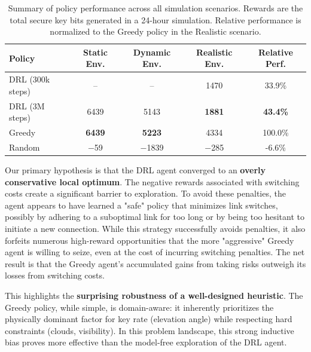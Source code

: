\documentclass[manuscript, review, nonacm]{acmart}
\begin{document}
\begin{table}[t]
  \centering
  \caption{Summary of policy performance across all simulation scenarios. Rewards are the total secure key bits generated in a 24-hour simulation. Relative performance is normalized to the Greedy policy in the Realistic scenario.}
  \label{tab:results}
  \begin{tabular}{lcccc}
    \toprule
    \textbf{Policy} & \textbf{Static Env.} & \textbf{Dynamic Env.} & \textbf{Realistic Env.} & \textbf{Relative Perf.} \\
    \midrule
    DRL (300k steps) & -- & -- & \num[group-separator={,}]{1470} & 33.9\% \\ %
    DRL (3M steps) & \num[group-separator={,}]{6439} & \num[group-separator={,}]{5143} & \textbf{\num[group-separator={,}]{1881}} & \textbf{43.4\%} \\
    Greedy & \textbf{\num[group-separator={,}]{6439}} & \textbf{\num[group-separator={,}]{5223}} & \num[group-separator={,}]{4334} & 100.0\% \\
    Random & \num[group-separator={,}]{-59} & \num[group-separator={,}]{-1839} & \num[group-separator={,}]{-285} & -6.6\% \\
    \bottomrule
  \end{tabular}
\end{table}


Our primary hypothesis is that the DRL agent converged to an \textbf{overly conservative local optimum}. The negative rewards associated with switching costs create a significant barrier to exploration. To avoid these penalties, the agent appears to have learned a "safe" policy that minimizes link switches, possibly by adhering to a suboptimal link for too long or by being too hesitant to initiate a new connection. While this strategy successfully avoids penalties, it also forfeits numerous high-reward opportunities that the more "aggressive" Greedy agent is willing to seize, even at the cost of incurring switching penalties. The net result is that the Greedy agent's accumulated gains from taking risks outweigh its losses from switching costs.

This highlights the \textbf{surprising robustness of a well-designed heuristic}. The Greedy policy, while simple, is domain-aware: it inherently prioritizes the physically dominant factor for key rate (elevation angle) while respecting hard constraints (clouds, visibility). In this problem landscape, this strong inductive bias proves more effective than the model-free exploration of the DRL agent.
\end{document}
